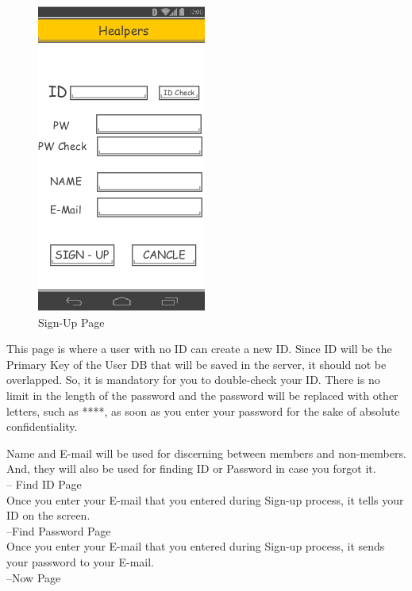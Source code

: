 \documentclass[conference]{IEEEtran}
\begin{document}
\begin{figure}[h]
\begin{center}
    \includegraphics[scale=1]{img_11}
    \caption{Sign-Up Page} 
\end{center}
\end{figure}

 This page is where a user with no ID can create a new ID. Since ID will be the Primary Key of the User DB that will be saved in the server, it should not be overlapped. So, it is mandatory for you to double-check your ID. There is  no limit in the length of the password and the password will be replaced with other letters, such as ****, as soon as you enter your password for the sake of absolute confidentiality.

 Name and E-mail will be used for discerning between members and non-members. And, they will also be used for finding ID or Password in case you forgot it.\\

 -- Find ID Page\\

 Once you enter your E-mail that you entered during Sign-up process, it tells your ID on the screen.\\

 --Find Password Page\\

 Once you enter your E-mail that you entered during Sign-up process, it sends your password to your E-mail.\\
 
 --Now Page
 
\end{document}
